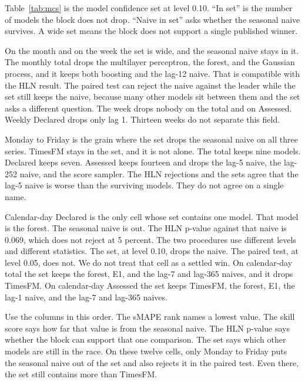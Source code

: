 Table~\ref{tab:mcs} is the model confidence set at level 0.10.
``In set'' is the number of models the block does not drop.
``Naive in set'' asks whether the seasonal naive survives.
A wide set means the block does not support a single published winner.

\begin{table}[ht]
  \caption{Model confidence set at level 0.10.
  The set is the models the test block does not separate.
  ``Naive in set'' refers to the seasonal naive used in the skill score.
  A short left-out list is the models the set drops.
  A long list is counted.}
  \label{tab:mcs}
  \centering
  \scriptsize
  
\end{table}

On the month and on the week the set is wide, and the seasonal naive stays in it.
The monthly total drops the multilayer perceptron, the forest, and the Gaussian process, and it keeps both boosting and the lag-12 naive.
That is compatible with the HLN result.
The paired test can reject the naive against the leader while the set still keeps the naive, because many other models sit between them and the set asks a different question.
The week drops nobody on the total and on Assessed.
Weekly Declared drops only lag 1.
Thirteen weeks do not separate this field.

Monday to Friday is the grain where the set drops the seasonal naive on all three series.
TimesFM stays in the set, and it is not alone.
The total keeps nine models.
Declared keeps seven.
Assessed keeps fourteen and drops the lag-5 naive, the lag-252 naive, and the score sampler.
The HLN rejections and the sets agree that the lag-5 naive is worse than the surviving models.
They do not agree on a single name.

Calendar-day Declared is the only cell whose set contains one model.
That model is the forest.
The seasonal naive is out.
The HLN p-value against that naive is 0.069, which does not reject at 5 percent.
The two procedures use different levels and different statistics.
The set, at level 0.10, drops the naive.
The paired test, at level 0.05, does not.
We do not treat that cell as a settled win.
On calendar-day total the set keeps the forest, E1, and the lag-7 and lag-365 naives, and it drops TimesFM.
On calendar-day Assessed the set keeps TimesFM, the forest, E1, the lag-1 naive, and the lag-7 and lag-365 naives.

Use the columns in this order.
The sMAPE rank names a lowest value.
The skill score says how far that value is from the seasonal naive.
The HLN p-value says whether the block can support that one comparison.
The set says which other models are still in the race.
On these twelve cells, only Monday to Friday puts the seasonal naive out of the set and also rejects it in the paired test.
Even there, the set still contains more than TimesFM.

